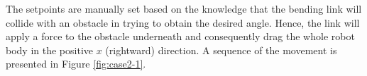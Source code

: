 The setpoints are manually set based on the knowledge that the bending link will collide with an obstacle in trying to obtain the desired angle. Hence, the link will apply a force to the obstacle underneath and consequently drag the whole robot body in the positive $x$ (rightward) direction. A sequence of the movement is presented in Figure \ref{fig:case2-1}. 

\begin{figure}[H]
    \centering
    
    \hfil
    

\end{figure}
